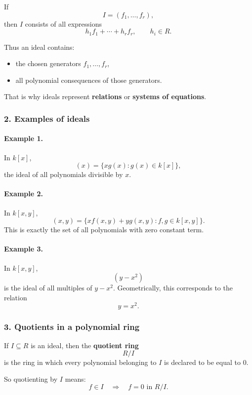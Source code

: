 \documentclass[12pt,a4paper]{article}
\theoremstyle{plain}
\theoremstyle{definition}      %
\begin{document}
	\medskip
	
	If
	\[
	I=(f_1,\dots,f_r),
	\]
	then \(I\) consists of all expressions
	\[
	h_1f_1+\cdots+h_rf_r,
	\qquad h_i\in R.
	\]
	
	Thus an ideal contains:
	\begin{itemize}
		\item the chosen generators \(f_1,\dots,f_r\),
		\item all polynomial consequences of those generators.
	\end{itemize}
	
	That is why ideals represent \textbf{relations} or \textbf{systems of equations}.
	
	\subsubsection*{2. Examples of ideals}
	
	\paragraph{Example 1.}
	In \(k[x]\),
	\[
	(x)=\{xg(x):g(x)\in k[x]\},
	\]
	the ideal of all polynomials divisible by \(x\).
	
	\paragraph{Example 2.}
	In \(k[x,y]\),
	\[
	(x,y)=\{xf(x,y)+yg(x,y):f,g\in k[x,y]\}.
	\]
	This is exactly the set of all polynomials with zero constant term.
	
	\paragraph{Example 3.}
	In \(k[x,y]\),
	\[
	(y-x^2)
	\]
	is the ideal of all multiples of \(y-x^2\).
	Geometrically, this corresponds to the relation
	\[
	y=x^2.
	\]
	
	\subsubsection*{3. Quotients in a polynomial ring}
	
	If \(I\subseteq R\) is an ideal, then the \textbf{quotient ring}
	\[
	R/I
	\]
	is the ring in which every polynomial belonging to \(I\) is declared to be equal to \(0\).
	
	So quotienting by \(I\) means:
	\[
	f\in I \quad\Longrightarrow\quad f=0 \text{ in } R/I.
	\]
	
\end{document}
